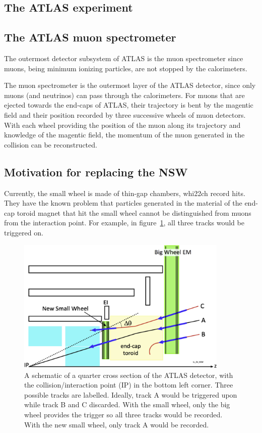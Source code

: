\subsection{The ATLAS experiment}

\subsection{The ATLAS muon spectrometer}
The outermost detector subsystem of ATLAS is the muon spectrometer since muons, being minimum ionizing particles, are not stopped by the calorimeters.

The muon spectrometer is the outermost layer of the ATLAS detector, since only muons (and neutrinos) can pass through the calorimeters. For muons that are ejected towards the end-caps of ATLAS, their trajectory is bent by the magentic field and their position recorded by three successive wheels of muon detectors. With each wheel providing the position of the muon along its trajectory and knowledge of the magentic field, the momentum of the muon generated in the collision can be reconstructed. 

\subsection{Motivation for replacing the NSW}
Currently, the small wheel is made of thin-gap chambers, whi22ch record hits. They have the known problem that particles generated in the material of the end-cap toroid magnet that hit the small wheel cannot be distinguished from muons from the interaction point. For example, in figure~\ref{fig:nsw_track_triggering}, all three tracks would be triggered on.

\begin{figure}
    \centering
    \includegraphics[width = 0.9\textwidth]{figures/perez-codina_NSW_tracks.jpg}
    \caption{A schematic of a quarter cross section of the ATLAS detector, with the collision/interaction point (IP) in the bottom left corner. Three possible tracks are labelled. Ideally, track A would be triggered upon while track B and C discarded. With the small wheel, only the big wheel provides the trigger so all three tracks would be recorded. With the new small wheel, only track A would be recorded.}
    \label{fig:nsw_track_triggering}
\end{figure}



